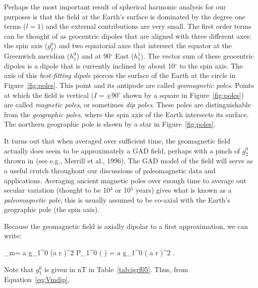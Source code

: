 Perhaps the most important result of
%
spherical harmonic analysis for our purposes is that the field at the Earth's surface is dominated
by the degree one terms ($l=1$) and the external contributions are very
small.
  The first order terms can be thought of as geocentric dipoles that are aligned
with three different axes: the spin axis ($g_1^0$) and two equatorial axes 
that intersect the equator at the Greenwich meridian 
($h_1^0$) and at 90$^{\circ}$ East ($h_1^1$).               
%
%
The vector sum of these geocentric dipoles  is a dipole that is currently
 inclined by about 10$^{\circ}$ to the spin axis.  The
axis of this {\it best-fitting dipole} pierces the surface of the Earth at the circle in
Figure~\ref{fig:poles}.  This point and its antipode are called
 {\it geomagnetic poles}.  Points at which the field
is vertical ($I = \pm 90^{\circ}$ shown by a square in Figure~\ref{fig:poles}) are called  
{\it magnetic poles}, or sometimes 
%
%
%
%
{\it dip poles}.  These poles are distinguishable from the {\it geographic poles},
  where the spin axis of the Earth intersects its surface.
The northern geographic pole is shown by a star in Figure~\ref{fig:poles}.

%
%
It turns out that when averaged over sufficient time, the geomagnetic field  actually does seem  to be  approximately  a GAD field, perhaps with a pinch of $g_2^0$ thrown in
 \nocite{merrill96}
 (see e.g., Merrill et al., 1996). 
The GAD model of the field will serve as a useful crutch 
throughout our discussions of
paleomagnetic data and applications. 
Averaging ancient magnetic poles over enough time to average out secular variation (thought to be  10$^4$ or 10$^5$ years)  gives what is known
as a 
%
{\it paleomagnetic pole}; this  is usually assumed to be co-axial with the Earth's geographic pole (the spin axis).  


Because the geomagnetic field is axially dipolar 
to a  first approximation, we can write:

\beq \psi_m= {a }g_1^0 \left({a \over r} \right)^2 P_1^0 ( \cos \theta ) = {a } g_1^0
\left( {a \over r} \right)^2 \cos \theta.
\label{eq:Vmdip}
\eeq

 Note that $g_1^0$ is given in nT in Table~\ref{tab:igrf05}.    Thus, from Equation~\ref{eq:Vmdip}, 

